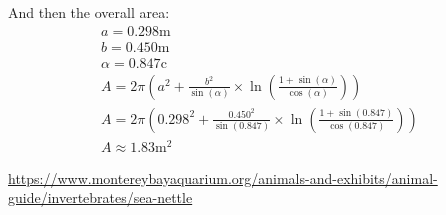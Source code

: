 \documentclass[fleqn]{article}
\newcommand{\unit}[1]{\ensuremath{\mathrm{#1}}}
\begin{document}
And then the overall area:
\begin{gather*}
  a = 0.298\unit{m} \\
  b = 0.450\unit{m} \\
  \alpha = 0.847\unit{c} \\
  A = 2\pi\left(a^2+\frac{b^2}{\sin(\alpha)}\times\ln\left(\frac{1+\sin(\alpha)}{\cos(\alpha)}\right)\right) \\
  A = 2\pi\left(0.298^2+\frac{0.450^2}{\sin(0.847)}\times\ln\left(\frac{1+\sin(0.847)}{\cos(0.847)}\right)\right) \\
  A \approx 1.83\unit{m^2}
\end{gather*}

\href{https://www.montereybayaquarium.org/animals-and-exhibits/animal-guide/invertebrates/sea-nettle}{https://www.montereybayaquarium.org/animals-and-exhibits/animal-guide/invertebrates/sea-nettle}
\end{document}
